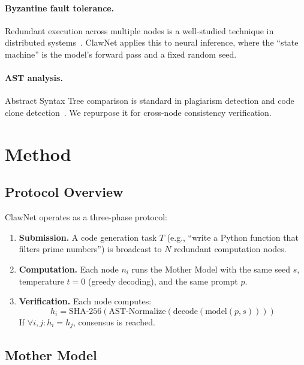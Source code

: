 \documentclass[11pt,a4paper]{article}
\begin{document}
\paragraph{Byzantine fault tolerance.}
Redundant execution across multiple nodes is a well-studied technique
in distributed systems~\cite{lamport1982byzantine}. ClawNet applies
this to neural inference, where the ``state machine'' is the model's
forward pass and a fixed random seed.

\paragraph{AST analysis.}
Abstract Syntax Tree comparison is standard in plagiarism detection
and code clone detection~\cite{baxter1998clone,jiang2007deckard}.
We repurpose it for cross-node consistency verification.

\section{Method}
\label{sec:method}

\subsection{Protocol Overview}

ClawNet operates as a three-phase protocol:

\begin{enumerate}
    \item \textbf{Submission.} A code generation task $T$ (e.g., ``write a
          Python function that filters prime numbers'') is broadcast to
          $N$ redundant computation nodes.
    \item \textbf{Computation.} Each node $n_i$ runs the Mother Model
          with the same seed $s$, temperature $t=0$ (greedy decoding),
          and the same prompt $p$.
    \item \textbf{Verification.} Each node computes:
          \begin{equation}
          h_i = \text{SHA-256}(\text{AST-Normalize}(\text{decode}(\text{model}(p, s))))
          \end{equation}
          If $\forall i,j : h_i = h_j$, consensus is reached.
\end{enumerate}

\subsection{Mother Model}
\end{document}
